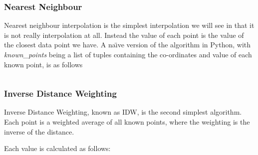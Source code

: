 


        \subsubsection{Nearest Neighbour}\label{background_interpolation_methods_nearest_neighbour}

            Nearest neighbour interpolation is the simplest interpolation we will see in that it is not really interpolation at all. Instead the value of each point is the value of the closest data point we have. A na\"{\i}ve version of the algorithm in Python, with \emph{known\_points} being a list of tuples containing the co-ordinates and value of each known point, is as follows\:

            \inputminted[mathescape,linenos,numbersep=5pt,frame=lines,framesep=2mm]{python}{../Data/OpenSense/nearest_neighbour.py}

        \subsubsection{Inverse Distance Weighting}\label{background_interpolation_methods_inversedistanceweighting}

            Inverse Distance Weighting, known as IDW, is the second simplest algorithm. Each point is a weighted average of all known points, where the weighting is the inverse of the distance. 

            Each value is calculated as follows:

